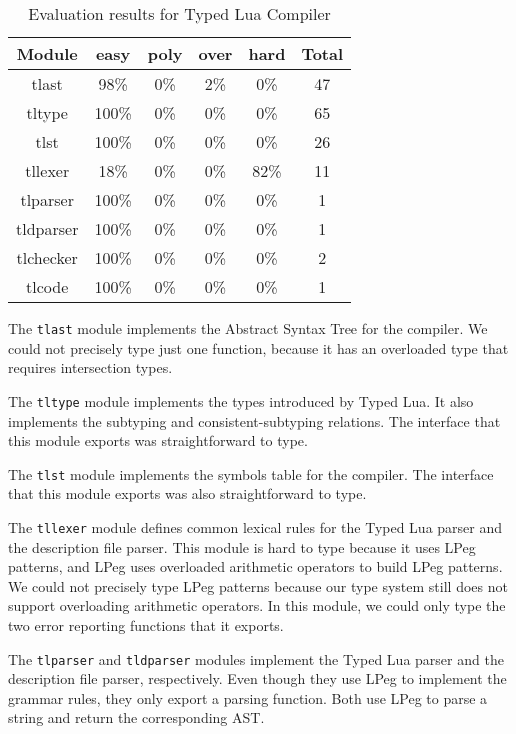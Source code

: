 \begin{table}[!ht]
\begin{center}
\begin{tabular}{|c|c|c|c|c|c|}
\hline
\textbf{Module} & \textbf{easy} & \textbf{poly} & \textbf{over} & \textbf{hard} & \textbf{Total} \\
\hline
tlast & 98\% & 0\% & 2\% & 0\% & 47 \\ %
\hline
tltype & 100\% & 0\% & 0\% & 0\% & 65 \\ %
\hline
tlst & 100\% & 0\% & 0\% & 0\% & 26 \\ %
\hline
tllexer & 18\% & 0\% & 0\% & 82\% & 11 \\ %
\hline
tlparser & 100\% & 0\% & 0\% & 0\% & 1 \\ %
\hline
tldparser & 100\% & 0\% & 0\% & 0\% & 1 \\ %
\hline
tlchecker & 100\% & 0\% & 0\% & 0\% & 2 \\ %
\hline
tlcode & 100\% & 0\% & 0\% & 0\% & 1 \\ %
\hline
\end{tabular}
\end{center}
\caption{Evaluation results for Typed Lua Compiler}
\label{tab:evaltlc}
\end{table}

The \texttt{tlast} module implements the Abstract Syntax Tree for
the compiler.
We could not precisely type just one function, because it has
an overloaded type that requires intersection types.

The \texttt{tltype} module implements the types introduced by Typed Lua.
It also implements the subtyping and consistent-subtyping relations.
The interface that this module exports was straightforward to type.

The \texttt{tlst} module implements the symbols table for the compiler.
The interface that this module exports was also straightforward to type.

The \texttt{tllexer} module defines common lexical rules for
the Typed Lua parser and the description file parser.
This module is hard to type because it uses LPeg \citep{lpeg,ierusalimschy2009lpeg}
patterns, and LPeg uses overloaded arithmetic operators to
build LPeg patterns. 
We could not precisely type LPeg patterns because our
type system still does not support overloading arithmetic
operators.
In this module, we could only type the two error reporting functions
that it exports.

The \texttt{tlparser} and \texttt{tldparser} modules implement the Typed Lua
parser and the description file parser, respectively.
Even though they use LPeg to implement the grammar rules,
they only export a parsing function.
Both use LPeg to parse a string and return the corresponding AST.


